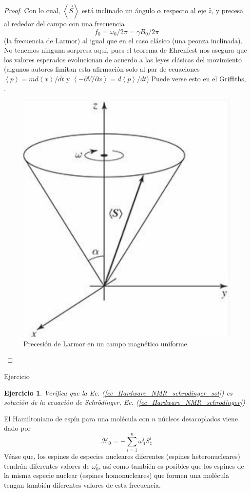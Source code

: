\documentclass[a4paper,11pt]{book} %
\newtheorem{ejercicio_contador}{Ejercicio}
\newcommand{\Ejercicio}[1]{
		\begin{mybox_gray}{Ejercicio} 
			\begin{ejercicio_contador}
				 #1 
			\end{ejercicio_contador} 
		\end{mybox_gray}
	}
\numberwithin{equation}{chapter}
\begin{document}
\begin{proof}
Con lo cual, $\left\langle \vec{S} \right\rangle$ está inclinado un ángulo $\alpha$ respecto al eje $\hat{z}$, y precesa al rededor del campo con una frecuencia 
	\begin{equation}
	f_0 = \omega_0 / 2 \pi = \gamma B_0 / 2 \pi
	\end{equation}
(la frecuencia de Larmor) al igual que en el caso clásico (una peonza inclinada). No tenemos ninguna sorpresa aquí, pues el teorema de Ehrenfest nos asegura que los valores esperados evolucionan de acuerdo a las leyes clásicas del movimiento (algunos autores limitan esta afirmación solo al par de ecuaciones $\left\langle p \right\rangle = m d \left\langle x \right\rangle / dt$ y $\left\langle - \partial V / \partial x \right\rangle = d \left\langle p \right\rangle / dt$) Puede verse esto en el Griffiths, \cite{bib_griffiths_schroeter_2018}. 
	\begin{figure}[H]
	\centering 
	\includegraphics[width=0.30\linewidth]{Figuras/Fig_Harware_NMR_precession_griffiths.png}
	\caption{Precesión de Larmor en un campo magnético uniforme.}
	\label{Fig_Harware_NMR_precession_griffiths}
	\end{figure}

\end{proof}


	\Ejercicio{
	Verifica que la Ec. (\ref{ec_Hardware_NMR_schrodinger_sol}) es solución de la ecuación de Schrödinger, Ec. (\ref{ec_Hardware_NMR_schrodinger})
	}

El Hamiltoniano de espín para una molécula con $n$ núcleos desacoplados viene dado por 
	\begin{equation} \label{ec_Hardware_NMR_H_single}
	\mathcal{H}_0 = - \sum_{i=1}^n  \omega_0^i S_z^i
	\end{equation}
Véase que, los espines de especies nucleares diferentes (espines heteronucleares) tendrán diferentes valores de $\omega_0^i$, así como también es posibles que los espines de la misma especie nuclear (espines homonucleares) que formen una molécula  tengan también diferentes valores de esta frecuencia.
\end{document}
